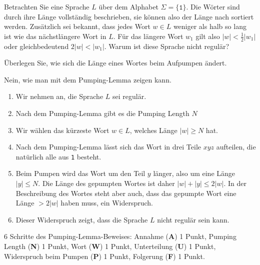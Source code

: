 Betrachten Sie eine Sprache $L$ über dem Alphabet $\Sigma=\{\texttt{1}\}$.
Die Wörter sind durch ihre Länge vollständig beschrieben, sie können also
der Länge nach sortiert werden.
Zusätzlich sei bekannt, dass jedes Wort $w\in L$ weniger als halb so lang
ist wie das nächstlängere Wort in $L$.
Für das längere Wort $w_1$ gilt also $|w| < \frac12|w_1|$ oder gleichbedeutend 
$2|w| < |w_1|$.
Warum ist diese Sprache nicht regulär?

\begin{hinweis}
Überlegen Sie, wie sich die Länge eines Wortes beim Aufpumpen ändert.
\end{hinweis}


\begin{loesung}
Nein, wie man mit dem Pumping-Lemma zeigen kann.
\begin{enumerate}
\item
Wir nehmen an, die Sprache $L$ sei regulär.
\item
Nach dem Pumping-Lemma gibt es die Pumping Length $N$
\item
Wir wählen das kürzeste Wort $w\in L$, welches Länge $|w|\ge N$ hat.
\item
Nach dem Pumping-Lemma lässt sich das Wort in drei Teile $xyz$ aufteilen,
die natürlich alle aus \texttt{1} besteht.
\item
Beim Pumpen wird das Wort um den Teil $y$ länger, also um eine Länge
$|y|\le N$.
Die Länge des gepumpten Wortes ist daher $|w|+|y|\le 2|w|$.
In der Beschreibung des Wortes steht aber auch, dass das gepumpte Wort
eine Länge $>2|w|$ haben muss, ein Widerspruch.
\item
Dieser Widerspruch zeigt, dass die Sprache $L$ nicht regulär sein kann.
\qedhere
\end{enumerate}
\end{loesung}

\begin{bewertung}
6 Schritte des Pumping-Lemma-Beweises:
Annahme ({\bf A}) 1 Punkt,
Pumping Length ({\bf N}) 1 Punkt,
Wort ({\bf W}) 1 Punkt,
Unterteilung ({\bf U}) 1 Punkt,
Widerspruch beim Pumpen ({\bf P}) 1 Punkt,
Folgerung ({\bf F}) 1 Punkt.
\end{bewertung}
